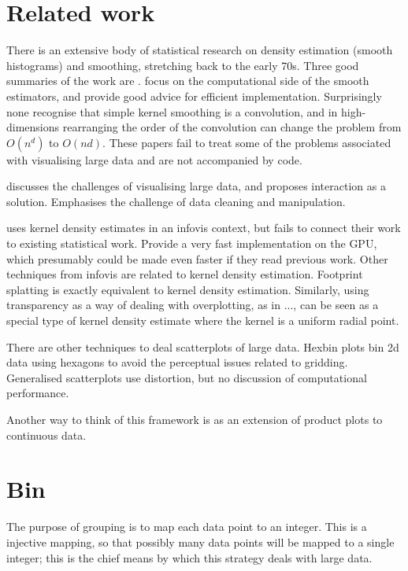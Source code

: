 \documentclass[journal]{vgtc}                %
\begin{document}
\section{Related work}
\label{sec:related-work}

There is an extensive body of statistical research on density estimation (smooth histograms) and smoothing, stretching back to the early 70s. Three good summaries of the work are \cite{scott:1992,bowman:1997,loader:1999a}.    \cite{hardle:1992,wand:1994,fan:1994} focus on the computational side of the smooth estimators, and provide good advice for efficient implementation.  Surprisingly none recognise that simple kernel smoothing is a convolution, and in high-dimensions rearranging the order of the convolution can change the problem from $O(n^d)$ to $O(nd)$. These papers fail to treat some of the problems associated with visualising large data and are not accompanied by code.

\citep{heer:2012} discusses the challenges of visualising large data, and proposes interaction as a solution. Emphasises the challenge of data cleaning and manipulation.

\citep{lampe:2011} uses kernel density estimates in an infovis context, but fails to connect their work to existing statistical work. Provide a very fast implementation on the GPU, which presumably could be made even faster if they read previous work. Other techniques from infovis are related to kernel density estimation. Footprint splatting \citep{becker:1997,yang:2003} is exactly equivalent to kernel density estimation.  Similarly, using transparency as a way of dealing with overplotting, as in ..., can be seen as a special type of kernel density estimate where the kernel is a uniform radial point.

There are other techniques to deal scatterplots of large data. Hexbin plots \citep{carr:1987} bin 2d data using hexagons to avoid the perceptual issues related to gridding. Generalised scatterplots \citep{keim:2010} use distortion, but no discussion of computational performance.  

Another way to think of this framework is as an extension of product plots \citep{me:prodplots} to continuous data.  

\section{Bin}
\label{sec:bin}

The purpose of grouping is to map each data point to an integer.  This is a injective mapping, so that possibly many data points will be mapped to a single integer; this is the chief means by which this strategy deals with large data.
\end{document}
